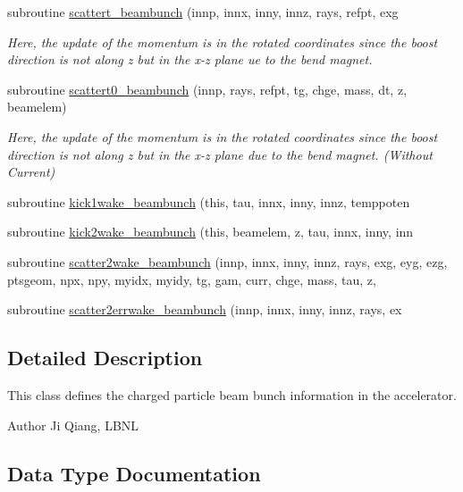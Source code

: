 \begin{DoxyCompactItemize}
subroutine \mbox{\hyperlink{namespacebeambunchclass_a3da6bfdf683e278c6005fddbceac16db}{scattert\+\_\+beambunch}} (innp, innx, inny, innz, rays, refpt, exg
\begin{DoxyCompactList}\small\item\em Here, the update of the momentum is in the rotated coordinates since the boost direction is not along z but in the x-\/z plane ue to the bend magnet. \end{DoxyCompactList}\item 
subroutine \mbox{\hyperlink{namespacebeambunchclass_a80dd0ce0010992cda1f2ba4d873371e0}{scattert0\+\_\+beambunch}} (innp, rays, refpt, tg, chge, mass, dt, z, beamelem)
\begin{DoxyCompactList}\small\item\em Here, the update of the momentum is in the rotated coordinates since the boost direction is not along z but in the x-\/z plane due to the bend magnet. (Without Current) \end{DoxyCompactList}\item 
subroutine \mbox{\hyperlink{namespacebeambunchclass_a02f7f46438747a0fb811de64b1ed95aa}{kick1wake\+\_\+beambunch}} (this, tau, innx, inny, innz, temppoten
\item 
subroutine \mbox{\hyperlink{namespacebeambunchclass_a530cca8371b8decda64389ce29d10bcd}{kick2wake\+\_\+beambunch}} (this, beamelem, z, tau, innx, inny, inn
\item 
subroutine \mbox{\hyperlink{namespacebeambunchclass_aa17d706a08d23a054bf547514e796e6a}{scatter2wake\+\_\+beambunch}} (innp, innx, inny, innz, rays, exg, eyg, ezg, ptsgeom, npx, npy, myidx, myidy, tg, gam, curr, chge, mass, tau, z,
\item 
subroutine \mbox{\hyperlink{namespacebeambunchclass_a2395bc91f4fc52175d8a5cc92890bb83}{scatter2errwake\+\_\+beambunch}} (innp, innx, inny, innz, rays, ex
\end{DoxyCompactItemize}


\subsection{Detailed Description}
This class defines the charged particle beam bunch information in the accelerator. 

\begin{DoxyAuthor}{Author}
Ji Qiang, L\+B\+NL 
\end{DoxyAuthor}


\subsection{Data Type Documentation}
\label{structbeambunchclass_1_1beambunch}
